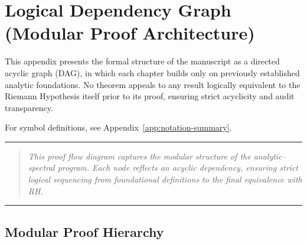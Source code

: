 \section{Logical Dependency Graph (Modular Proof Architecture)}
\label{app:dependency-graph}

This appendix presents the formal structure of the manuscript as a directed acyclic graph (DAG), in which each chapter builds only on previously established analytic foundations. No theorem appeals to any result logically equivalent to the Riemann Hypothesis itself prior to its proof, ensuring strict acyclicity and audit transparency.

For symbol definitions, see Appendix~\ref{app:notation-summary}.

\vspace{1ex}
\hrule
\vspace{1ex}

\begin{quote}
\textit{This proof flow diagram captures the modular structure of the analytic–spectral program. Each node reflects an acyclic dependency, ensuring strict logical sequencing from foundational definitions to the final equivalence with RH.}
\end{quote}

\vspace{1ex}
\hrule
\vspace{2ex}

\subsection*{Modular Proof Hierarchy}

